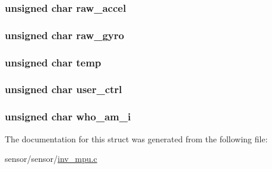 \subsubsection[{\texorpdfstring{raw\+\_\+accel}{raw_accel}}]{\setlength{\rightskip}{0pt plus 5cm}unsigned char raw\+\_\+accel}\hypertarget{structgyro__reg__s_a3a78e67f9066b6b8601f375fcaadf005}{}\label{structgyro__reg__s_a3a78e67f9066b6b8601f375fcaadf005}
\subsubsection[{\texorpdfstring{raw\+\_\+gyro}{raw_gyro}}]{\setlength{\rightskip}{0pt plus 5cm}unsigned char raw\+\_\+gyro}\hypertarget{structgyro__reg__s_a1366c90aec04a4e1d212de76d3f0b6cc}{}\label{structgyro__reg__s_a1366c90aec04a4e1d212de76d3f0b6cc}
\subsubsection[{\texorpdfstring{temp}{temp}}]{\setlength{\rightskip}{0pt plus 5cm}unsigned char temp}\hypertarget{structgyro__reg__s_abe413cb96d839cbe31417aa52d920f21}{}\label{structgyro__reg__s_abe413cb96d839cbe31417aa52d920f21}
\subsubsection[{\texorpdfstring{user\+\_\+ctrl}{user_ctrl}}]{\setlength{\rightskip}{0pt plus 5cm}unsigned char user\+\_\+ctrl}\hypertarget{structgyro__reg__s_ad8384710853dc1f9580b9ff19e87efbc}{}\label{structgyro__reg__s_ad8384710853dc1f9580b9ff19e87efbc}
\subsubsection[{\texorpdfstring{who\+\_\+am\+\_\+i}{who_am_i}}]{\setlength{\rightskip}{0pt plus 5cm}unsigned char who\+\_\+am\+\_\+i}\hypertarget{structgyro__reg__s_aa52d78bb2b62fee23a0b759e545dba4b}{}\label{structgyro__reg__s_aa52d78bb2b62fee23a0b759e545dba4b}


The documentation for this struct was generated from the following file\+:\begin{DoxyCompactItemize}
\item 
sensor/sensor/\hyperlink{inv__mpu_8c}{inv\+\_\+mpu.\+c}\end{DoxyCompactItemize}
